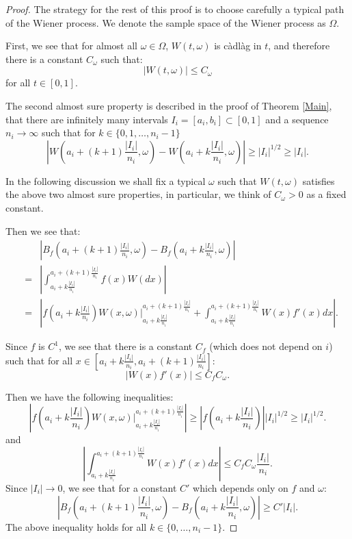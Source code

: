 \documentclass{amsart}
\begin{document}
\begin{proof}
	The strategy for the rest of this proof is to choose carefully a typical path of the Wiener process. We denote the sample space of the Wiener process as $\Omega$.

	First, we see that for almost all $\omega\in\Omega$, $W(t,\omega)$ is c\`adl\`ag in $t$, and therefore there is a constant $C_\omega$ such that:
	\[
	|W(t,\omega)|\leq C_\omega
	\]
    for all $t\in [0,1]$. 

The second almost sure property is described in the proof of Theorem \ref{Main}, that there are infinitely many intervals $I_i=[a_i,b_i]\subset [0,1]$ and a sequence $n_i\to\infty$ such that for $k\in\{0,1,\dots,n_i-1\}$
    \[
    \left|W\left(a_i+(k+1)\frac{|I_i|}{n_i},\omega\right)-W\left(a_i+k\frac{|I_i|}{n_i},\omega\right)\right|\geq |I_i|^{1/2}\geq |I_i|.
    \]

    In the following discussion we shall fix a typical $\omega$ such that $W(t,\omega)$ satisfies the above two almost sure properties, in particular, we think of $C_\omega>0$ as a fixed constant.

	Then we see that:
	\begin{eqnarray*}
	& &\left|B_f\left(a_i+(k+1)\frac{|I_i|}{n_i},\omega\right)-B_f\left(a_i+k\frac{|I_i|}{n_i},\omega\right)\right|\\
    &=& \left| \int_{a_i+k\frac{|I_i|}{n_i}}^{a_i+(k+1)\frac{|I_i|}{n_i}} f(x)W(dx)\right|\\
	&=& \left| f\left(a_i+k\frac{|I_i|}{n_i}\right)W(x,\omega)\bigg\vert_{a_i+k\frac{|I_i|}{n_i}}^{a_i+(k+1)\frac{|I_i|}{n_i}} + \int_{a_i+k\frac{|I_i|}{n_i}}^{a_i+(k+1)\frac{|I_i|}{n_i}} W(x)f'(x)dx \right|.
	\end{eqnarray*}
	 
	Since $f$ is $C^1$, we see that there is a constant $C_f$ (which does not depend on $i$) such that for all $x\in \left[{a_i+k\frac{|I_i|}{n_i}},{a_i+(k+1)\frac{|I_i|}{n_i}}\right]$:
	\[
	\left\vert W(x)f'(x)\right\vert \leq C_f C_\omega.
	\]
	
	Then we have the following inequalities:
	\[
	\left| f\left(a_i+k\frac{|I_i|}{n_i}\right)W(x,\omega)\bigg\vert_{a_i+k\frac{|I_i|}{n_i}}^{a_i+(k+1)\frac{|I_i|}{n_i}} \right| \geq \left| f\left(a_i+k\frac{|I_i|}{n_i}\right) \right| |I_i|^{1/2}\geq |I_i|^{1/2}.\tag{**}
	\]
	and
	\[
	\left\vert\int_{a_i+k\frac{|I_i|}{n_i}}^{a_i+(k+1)\frac{|I_i|}{n_i}} W(x)f'(x)dx \right\vert\leq C_fC_\omega\frac{|I_i|}{n_i}.
	\]
       Since $|I_i|\to 0$,  we see that for a constant $C'$ which depends only on $f$ and $\omega$:
	\[
	\left|B_f\left(a_i+(k+1)\frac{|I_i|}{n_i},\omega\right)-B_f\left(a_i+k\frac{|I_i|}{n_i},\omega\right)\right|\geq C'|I_i|.\tag{***}
	\]
	 The above inequality holds for all $k\in\{0,\dots,n_i-1\}$. 
     

\end{proof}
\end{document}
